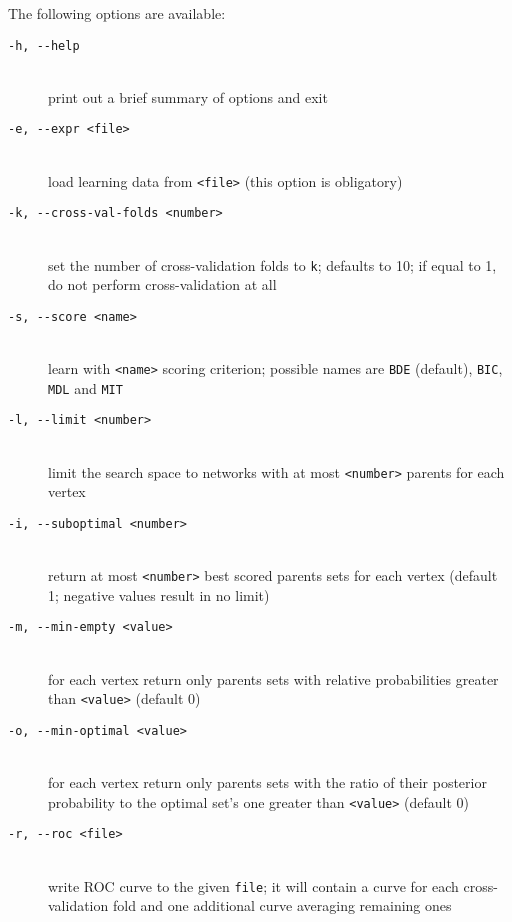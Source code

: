 The following options are available:
\begin{description}
\item[\texttt{-h, -\hspace{0pt}-help}]~\\
 print out a brief summary of options and exit
\item[\texttt{-e, -\hspace{0pt}-expr <file>}]~\\
 load learning data from \texttt{<file>} (this option is obligatory)
\item[\texttt{-k, -\hspace{0pt}-cross-val-folds <number>}]~\\
 set the number of cross-validation folds to \texttt{k}; defaults to 10;
 if equal to 1, do not perform cross-validation at all
\item[\texttt{-s, -\hspace{0pt}-score <name>}]~\\
 learn with \texttt{<name>} scoring criterion;
 possible names are \texttt{BDE} (default), \texttt{BIC}, \texttt{MDL} and \texttt{MIT}
\item[\texttt{-l, -\hspace{0pt}-limit <number>}]~\\
 limit the search space to networks with at most 
 \texttt{<number>} parents for each vertex
\item[\texttt{-i, -\hspace{0pt}-suboptimal <number>}]~\\
 return at most \texttt{<number>} best scored parents sets for each vertex 
 (default 1; negative values result in no limit)
\item[\texttt{-m, -\hspace{0pt}-min-empty <value>}]~\\
 for each vertex return only parents sets with relative probabilities 
 greater than \texttt{<value>} (default 0)
\item[\texttt{-o, -\hspace{0pt}-min-optimal <value>}]~\\
 for each vertex return only parents sets with the ratio of their
 posterior probability to the optimal set's one
 greater than \texttt{<value>} (default 0)
\item[\texttt{-r, -\hspace{0pt}-roc <file>}]~\\
 write ROC curve to the given \texttt{file}; it will contain a curve for each
 cross-validation fold and one additional curve averaging remaining ones

\end{description}
